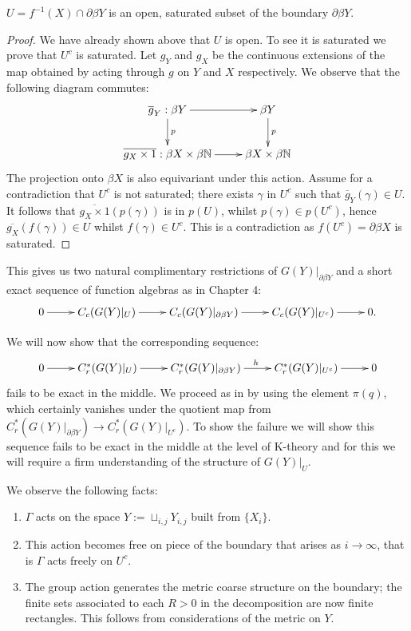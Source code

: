 \begin{example}
\begin{lemma}
$U = f^{-1}(X)\cap \partial\beta Y$ is an open, saturated subset of the boundary $\partial\beta Y$. 
\end{lemma}
\begin{proof}
We have already shown above that $U$ is open. To see it is saturated we prove that $U^{c}$ is saturated. Let $g_{Y}$ and $g_{X}$ be the continuous extensions of the map obtained by acting through $g$ on $Y$ and $X$ respectively. We observe that the following diagram commutes:
\begin{equation*}
\xymatrix{
\overline{g}_{Y}:\beta Y\ar[r]\ar[d]^{p} & \beta Y\ar[d]^{p}\\
\overline{g_{X} \times 1}:  \beta X \times \beta \mathbb{N} \ar[r] & \beta X \times \beta \mathbb{N}
}
\end{equation*}
The projection onto $\beta X$ is also equivariant under this action. Assume for a contradiction that $U^{c}$ is not saturated; there exists $\gamma$ in $U^{c}$ such that $\overline{g}_{Y}(\gamma) \in U$. It follows that $\overline{g_{X} \times 1}(p(\gamma))$ is in $p(U)$, whilst $p(\gamma) \in p(U^{c})$, hence $\overline{g_{X}}(f(\gamma))\in U$ whilst $f(\gamma) \in U^{c}$. This is a contradiction as $f(U^{c}) = \partial\beta X$ is saturated.
\end{proof}

This gives us two natural complimentary restrictions of $G(Y)|_{\partial\beta Y}$ and a short exact sequence of function algebras as in Chapter 4:
\begin{equation*}
\xymatrix{
0 \ar[r] & C_{c}(G(Y)|_{U}) \ar[r]& C_{c}(G(Y)|_{\partial\beta Y}) \ar[r] & C_{c}(G(Y)|_{U^{c}}) \ar[r] & 0.
}
\end{equation*}

We will now show that the corresponding sequence:
\begin{equation*}
\xymatrix{
0 \ar[r] & C^{*}_{r}(G(Y)|_{U}) \ar[r]& C_{r}^{*}(G(Y)|_{\partial\beta Y}) \ar[r]^{h} & C_{r}^{*}(G(Y)|_{U^{c}}) \ar[r] & 0
}
\end{equation*}
fails to be exact in the middle. We proceed as in \cite{explg1,MR1911663} by using the element $\pi(q)$, which certainly vanishes under the quotient map from $C^{*}_{r}(G(Y)|_{\partial\beta Y}) \rightarrow C^{*}_{r}(G(Y)|_{U^{c}})$. To show the failure we will show this sequence fails to be exact in the middle at the level of K-theory and for this we will require a firm understanding of the structure of $G(Y)|_{U}$.

We observe the following facts: 
\begin{enumerate}
\item $\Gamma$ acts on the space $Y:=\sqcup_{i,j}Y_{i,j}$ built from $\lbrace X_{i} \rbrace$.
\item This action becomes free on piece of the boundary that arises as $i \rightarrow \infty$, that is $\Gamma$ acts freely on $U^{c}$.
\item The group action generates the metric coarse structure on the boundary; the finite sets associated to each $R>0$ in the decomposition are now finite rectangles. This follows from considerations of the metric on $Y$.
\end{enumerate} 


\end{example}
